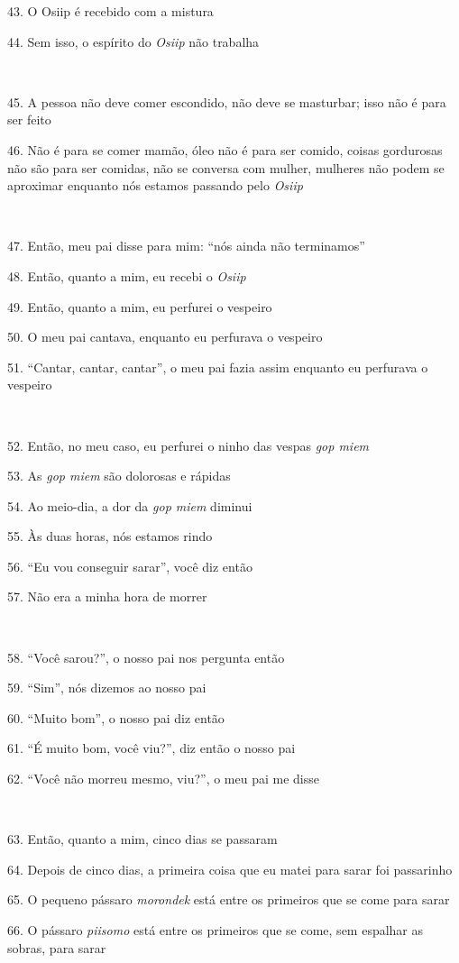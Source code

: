 43. O Osiip é recebido com a mistura

44. Sem isso, o espírito do \emph{Osiip} não trabalha

~

45. A pessoa não deve comer escondido, não deve se masturbar; isso não é
para ser feito

46. Não é para se comer mamão, óleo não é para ser comido, coisas
gordurosas não são para ser comidas, não se conversa com mulher,
mulheres não podem se aproximar enquanto nós estamos passando pelo
\emph{Osiip}

~

47. Então, meu pai disse para mim: ``nós ainda não terminamos''

48. Então, quanto a mim, eu recebi o \emph{Osiip}

49. Então, quanto a mim, eu perfurei o vespeiro

50. O meu pai cantava, enquanto eu perfurava o vespeiro

51. ``Cantar, cantar, cantar'', o meu pai fazia assim enquanto eu perfurava o vespeiro

~

52. Então, no meu caso, eu perfurei o ninho das vespas \emph{gop miem}

53. As \emph{gop miem} são dolorosas e rápidas

54. Ao meio-dia, a dor da \emph{gop miem} diminui

55. Às duas horas, nós estamos rindo

56. ``Eu vou conseguir sarar'', você diz então

57. Não era a minha hora de morrer

~

58. ``Você sarou?'', o nosso pai nos pergunta então

59. ``Sim'', nós dizemos ao nosso pai

60. ``Muito bom'', o nosso pai diz então

61. ``É muito bom, você viu?'', diz então o nosso pai

62. ``Você não morreu mesmo, viu?'', o meu pai me disse

~

63. Então, quanto a mim, cinco dias se passaram

64. Depois de cinco dias, a primeira coisa que eu matei para sarar foi
passarinho

65. O pequeno pássaro \emph{morondek} está entre os primeiros que se come
para sarar

66. O pássaro \emph{piisomo} está entre os primeiros que se come, sem
espalhar as sobras, para sarar

